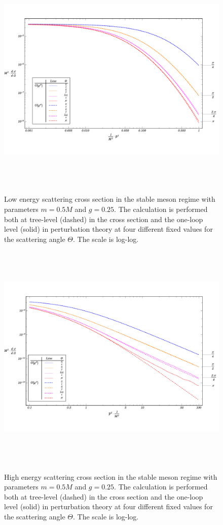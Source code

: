 \documentclass[12pt]{extarticle}
\begin{document}
\begin{figure}
\begin{center}
\vspace*{-2cm}
\includegraphics[width=15cm, height=11cm]{StableMeson-LowEnergy}
\caption{Low energy scattering cross section in the stable meson regime with parameters $m = 0.5 M$ and $g = 0.25$. The calculation is performed both at tree-level (dashed) in the cross section and the one-loop level (solid) in perturbation theory at four different fixed values for the scattering angle $\Theta$. The scale is log-log.} 
\label{StabLowEnergy}
\includegraphics[width=15cm, height=11cm]{StableMeson-HighEnergy}
\caption{High energy scattering cross section in the stable meson regime with parameters $m = 0.5 M$ and $g = 0.25$. The calculation is performed both at tree-level (dashed) in the cross section and the one-loop level (solid) in perturbation theory at four different fixed values for the scattering angle $\Theta$. The scale is log-log.} 
\label{StabHighEnergy}
\end{center}
\end{figure} 
\end{document}

